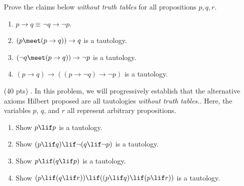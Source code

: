\begin{enumerate}
    Prove the claims below \emph{without truth tables} for all propositions $p, q, r$.
    \begin{enumerate}
      \item
        $p \rightarrow q \equiv \neg q \rightarrow \neg p$.
      \item
        $(p \meet (p \rightarrow q)) \rightarrow q$ is a tautology.
      \item
        $(\neg q \meet (p \rightarrow q)) \rightarrow \neg p$ is a tautology.
      \item
        $(p \rightarrow q) \rightarrow ((p \rightarrow \neg q) \rightarrow \neg p)$ is a tautology.
    \end{enumerate}
  \item[(40 pts) \quad 3.]
    In this problem, we will progressively establish that the alternative axioms Hilbert proposed are all tautologies \emph{without truth tables.}.
    Here, the variables $p$, $q$, and $r$ all represent arbitrary propositions.
    \begin{enumerate}
      \item
        Show $p \lif p$ is a tautology.
      \item
        Show $(p \lif q) \lif \neg (q \lif \neg p)$ is a tautology.
      \item
        Show $p \lif (q \lif p)$ is a tautology.
      \item
        Show $(p \lif (q \lif r)) \lif ((p \lif q) \lif (p \lif r))$ is a tautology.
    \end{enumerate}

\end{enumerate}
